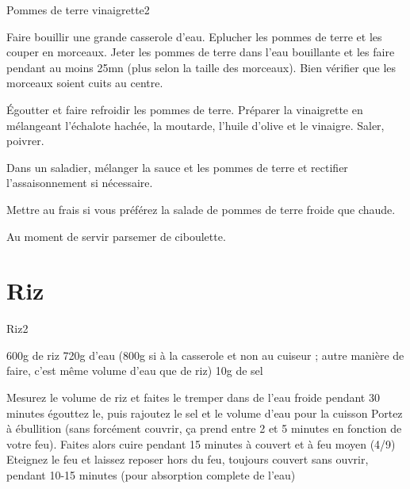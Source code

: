 {\begin{recette}{Pommes de terre vinaigrette}{2}{}{}
\begin{preparation}
\etape Faire bouillir une grande casserole d'eau. Eplucher les pommes de terre et les couper en morceaux. Jeter les pommes de 
terre dans l'eau bouillante et les faire pendant au moins 25mn (plus selon la taille des morceaux). Bien vérifier que les 
morceaux soient cuits au centre.

\etape Égoutter et faire refroidir les pommes de terre. Préparer la vinaigrette en mélangeant l'échalote hachée, la moutarde, 
l'huile d'olive et le vinaigre. Saler, poivrer.

\etape Dans un saladier, mélanger la sauce et les pommes de terre et rectifier l'assaisonnement si nécessaire.

\begin{remarque}
Mettre au frais si vous préférez la salade de pommes de terre froide que chaude.
\end{remarque}

\etape Au moment de servir parsemer de ciboulette.
\end{preparation}
\end{recette}

\section{Riz}
\begin{recette}{Riz}{2}{}{}\label{sec:riz}
\begin{ingredients}
\ingredient 600g de riz
\ingredient 720g d'eau (800g si à la casserole et non au cuiseur ; autre manière de faire, c'est même volume d'eau que de riz)
\ingredient 10g de sel
\end{ingredients}

\begin{preparation}
\etape Mesurez le volume de riz et faites le tremper dans de l'eau froide pendant 30 minutes
\etape égouttez le, puis rajoutez le sel et le volume d'eau pour la cuisson
\etape Portez à ébullition (sans forcément couvrir, ça prend entre 2 et 5 minutes en fonction de votre feu).
\etape Faites alors cuire pendant 15 minutes à couvert et à feu moyen (4/9)
\etape Eteignez le feu et laissez reposer hors du feu, toujours couvert sans ouvrir, pendant 10-15 minutes (pour absorption complete de l'eau)
\end{preparation}
\end{recette}

}
